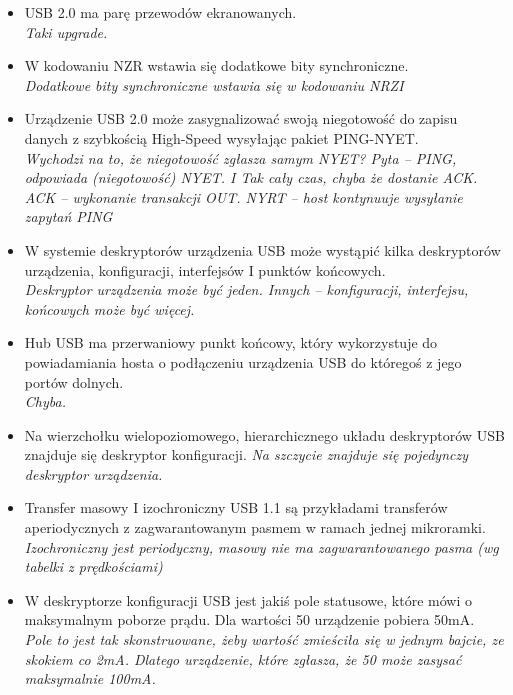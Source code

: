 \begin{itemize}
	\item \textcolor{tak}{USB 2.0 ma parę przewodów ekranowanych.} \\
	{\small \emph{Taki upgrade.}}
	
	\item \textcolor{nie}{W kodowaniu NZR wstawia się dodatkowe bity synchroniczne.} \\
	{\small \emph{Dodatkowe bity synchroniczne wstawia się w kodowaniu NRZI}}
		
	\item \textcolor{nie}{Urządzenie USB 2.0 może zasygnalizować swoją niegotowość do zapisu danych z szybkością High-Speed wysyłając pakiet PING-NYET.} \\
	{\small \emph{Wychodzi na to, że niegotowość zgłasza samym NYET? Pyta – PING, odpowiada (niegotowość) NYET. I Tak cały czas, chyba że dostanie ACK. ACK – wykonanie transakcji OUT. NYRT – host kontynuuje wysyłanie zapytań PING}}
	
	\item \textcolor{nie}{W systemie deskryptorów urządzenia USB może wystąpić kilka deskryptorów urządzenia, konfiguracji, interfejsów I punktów końcowych.} \\
	{\small \emph{Deskryptor urządzenia może być jeden. Innych – konfiguracji, interfejsu, końcowych może być więcej.}}
	
	\item \textcolor{tak}{Hub USB ma przerwaniowy punkt końcowy, który wykorzystuje do powiadamiania hosta o podłączeniu	urządzenia USB do któregoś z jego portów dolnych.} \\
	{\small \emph{Chyba.}}
	
	\item \textcolor{nie}{Na wierzchołku wielopoziomowego, hierarchicznego układu deskryptorów USB znajduje się deskryptor konfiguracji.}
	{\small \emph{Na szczycie znajduje się pojedynczy deskryptor urządzenia.}}
	
	\item \textcolor{nie}{Transfer masowy I izochroniczny USB 1.1 są przykładami transferów aperiodycznych z zagwarantowanym pasmem w ramach jednej mikroramki.} \\
	{\small \emph{Izochroniczny jest periodyczny, masowy nie ma zagwarantowanego pasma (wg tabelki z	prędkościami)}}
	
	\item \textcolor{nie}{W deskryptorze konfiguracji USB jest jakiś pole statusowe, które mówi o maksymalnym poborze prądu. Dla wartości 50 urządzenie pobiera 50mA.} \\
	{\small \emph{Pole to jest tak skonstruowane, żeby wartość zmieściła się w jednym bajcie, ze skokiem co 2mA. Dlatego urządzenie, które zgłasza, że 50 może zasysać maksymalnie 100mA.}}
	

\end{itemize}
